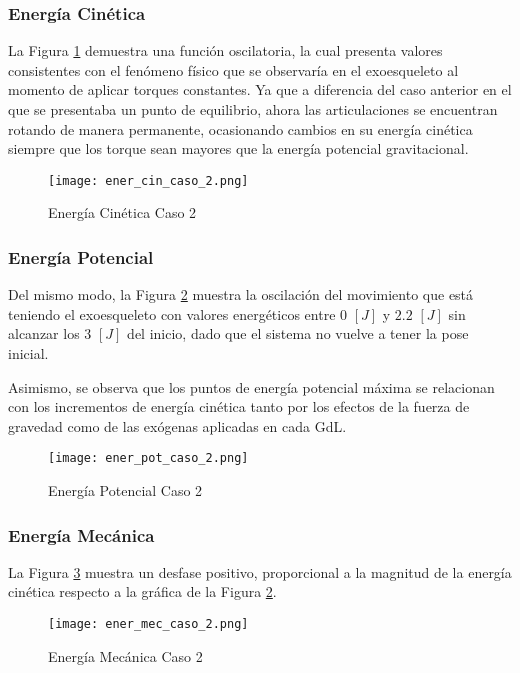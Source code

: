     \subsubsection{Energía Cinética}
    \noindent La Figura \ref{fig:eCinC2} demuestra una función oscilatoria, la cual presenta valores 
    consistentes con el fenómeno físico que se observaría en el exoesqueleto al momento de 
    aplicar torques constantes. Ya que a diferencia del caso anterior en el que se presentaba 
    un punto de equilibrio, ahora las articulaciones se encuentran rotando de manera 
    permanente, ocasionando cambios en su energía cinética siempre que los torque sean mayores que 
    la energía potencial gravitacional.

    \begin{figure} [H]%
            \centering
            \texttt{[image: ener\_cin\_caso\_2.png]} 
        \caption{Energía Cinética Caso 2}
        \label{fig:eCinC2}
    \end{figure}

    \subsubsection{Energía Potencial}
    Del mismo modo, la Figura 
    \ref{fig:ePotC2}  muestra la oscilación del movimiento que está teniendo 
    el exoesqueleto con valores energéticos entre $0$ $[J]$ y $2.2$ $[J]$
    sin alcanzar los $3$ $[J]$ del inicio, dado que el sistema no vuelve a tener la pose inicial. 
    
    Asimismo, se observa que los puntos de energía potencial máxima se relacionan con 
    los incrementos de energía cinética tanto por los efectos de la fuerza de gravedad como de las 
    exógenas aplicadas en cada GdL. 

    \begin{figure} [H]%
            \centering
            \texttt{[image: ener\_pot\_caso\_2.png]} 
        \caption{Energía Potencial Caso 2}
        \label{fig:ePotC2}
    \end{figure}

    \subsubsection{Energía Mecánica}
    \noindent La Figura \ref{fig:eMecC2} muestra un desfase positivo, 
    proporcional a la magnitud de la energía cinética respecto a la 
    gráfica de la Figura \ref{fig:ePotC2}.
    \begin{figure} [H]%
            \centering
            \texttt{[image: ener\_mec\_caso\_2.png]} 
        \caption{Energía Mecánica Caso 2}
        \label{fig:eMecC2}
    \end{figure}

